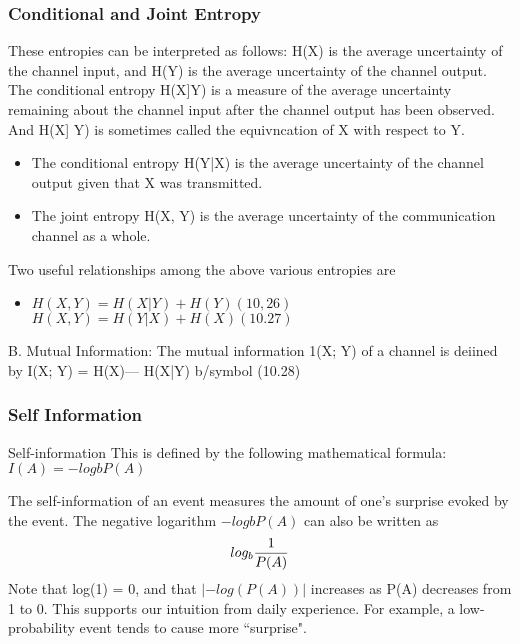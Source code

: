 \documentclass[a4]{beamer}
\begin{document}
\begin{frame}
\frametitle{Conditional and Joint Entropy}
These entropies can be interpreted as follows: H(X) is the average uncertainty of the channel input,
and H(Y) is the average uncertainty of the channel output. The conditional entropy H(X]Y) is a
measure of the average uncertainty remaining about the channel input after the channel output has
been observed. And H(X] Y) is sometimes called the equivncation of X with respect to Y. \begin{itemize} \item The
conditional entropy H(Y|X) is the average uncertainty of the channel output given that X was
transmitted.\item  The joint entropy H(X, Y) is the average uncertainty of the communication channel as a
whole.\end{itemize}
\end{frame}
\begin{frame}
Two useful relationships among the above various entropies are
\begin{itemize} \item
$H(X, Y)=H(X|Y)+H(Y) (10,26)$
$H(X,Y)=H(Y|X)+H(X) (10.27)$
\end{itemize}
B. Mutual Information:
The mutual information 1(X; Y) of a channel is deiined by
I(X; Y) = H(X)— H(X|Y) b/symbol (10.28)
\end{frame}

\begin{frame} %
\frametitle{Self Information}Self-information
This is defined by the following mathematical formula:$I(A) = −logb P(A)$

The self-information of an event measures the amount of one’s surprise
evoked by the event. The negative logarithm $−logb P(A)$ can also be written as \[
log_b  {1 \over P(A)} \]
Note that log(1) = 0, and that $| − log(P(A))|$ increases as P(A) decreases
from 1 to 0. This supports our intuition from daily experience. For example,
a low-probability event tends to cause more ``surprise".
\end{frame}
\end{document}
